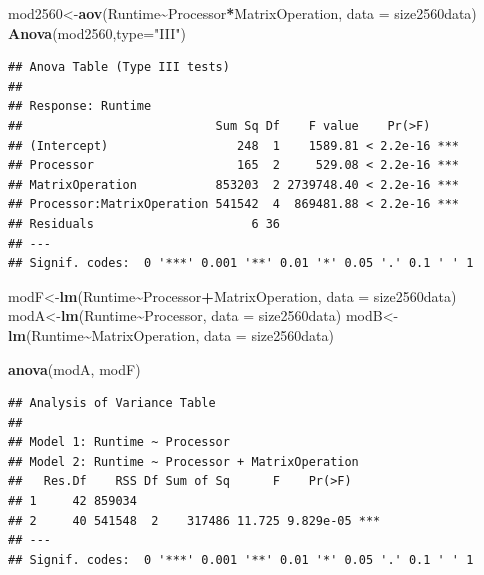 \documentclass[
]{article}
\newenvironment{Shaded}{\begin{snugshade}}{\end{snugshade}}
\newcommand{\DataTypeTok}[1]{\textcolor[rgb]{0.13,0.29,0.53}{#1}}
\newcommand{\KeywordTok}[1]{\textcolor[rgb]{0.13,0.29,0.53}{\textbf{#1}}}
\newcommand{\NormalTok}[1]{#1}
\newcommand{\OperatorTok}[1]{\textcolor[rgb]{0.81,0.36,0.00}{\textbf{#1}}}
\newcommand{\StringTok}[1]{\textcolor[rgb]{0.31,0.60,0.02}{#1}}
\begin{document}
\begin{Shaded}
\begin{Highlighting}[]
\NormalTok{mod2560\textless{}{-}}\KeywordTok{aov}\NormalTok{(Runtime}\OperatorTok{\textasciitilde{}}\NormalTok{Processor}\OperatorTok{*}\NormalTok{MatrixOperation, }\DataTypeTok{data =}\NormalTok{ size2560data)}
\KeywordTok{Anova}\NormalTok{(mod2560,}\DataTypeTok{type=}\StringTok{"III"}\NormalTok{)}
\end{Highlighting}
\end{Shaded}

\begin{verbatim}
## Anova Table (Type III tests)
## 
## Response: Runtime
##                           Sum Sq Df    F value    Pr(>F)    
## (Intercept)                  248  1    1589.81 < 2.2e-16 ***
## Processor                    165  2     529.08 < 2.2e-16 ***
## MatrixOperation           853203  2 2739748.40 < 2.2e-16 ***
## Processor:MatrixOperation 541542  4  869481.88 < 2.2e-16 ***
## Residuals                      6 36                         
## ---
## Signif. codes:  0 '***' 0.001 '**' 0.01 '*' 0.05 '.' 0.1 ' ' 1
\end{verbatim}

\begin{Shaded}
\begin{Highlighting}[]
\NormalTok{modF\textless{}{-}}\KeywordTok{lm}\NormalTok{(Runtime}\OperatorTok{\textasciitilde{}}\NormalTok{Processor}\OperatorTok{+}\NormalTok{MatrixOperation, }\DataTypeTok{data =}\NormalTok{ size2560data)}
\NormalTok{modA\textless{}{-}}\KeywordTok{lm}\NormalTok{(Runtime}\OperatorTok{\textasciitilde{}}\NormalTok{Processor, }\DataTypeTok{data =}\NormalTok{ size2560data)}
\NormalTok{modB\textless{}{-}}\KeywordTok{lm}\NormalTok{(Runtime}\OperatorTok{\textasciitilde{}}\NormalTok{MatrixOperation, }\DataTypeTok{data =}\NormalTok{ size2560data)}

\KeywordTok{anova}\NormalTok{(modA, modF)}
\end{Highlighting}
\end{Shaded}

\begin{verbatim}
## Analysis of Variance Table
## 
## Model 1: Runtime ~ Processor
## Model 2: Runtime ~ Processor + MatrixOperation
##   Res.Df    RSS Df Sum of Sq      F    Pr(>F)    
## 1     42 859034                                  
## 2     40 541548  2    317486 11.725 9.829e-05 ***
## ---
## Signif. codes:  0 '***' 0.001 '**' 0.01 '*' 0.05 '.' 0.1 ' ' 1
\end{verbatim}
\end{document}
